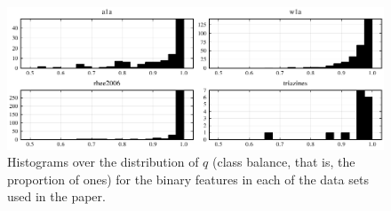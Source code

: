 \begin{figure}[htpb]
  \centering
  \includegraphics[]{plots/data-hist-q.pdf}
  \caption{%
    Histograms over the distribution of \(q\) (class balance, that is, the
    proportion of ones) for the binary features in each of the data sets
    used in the paper.
  }
  \label{fig:data-hist-q}
\end{figure}

